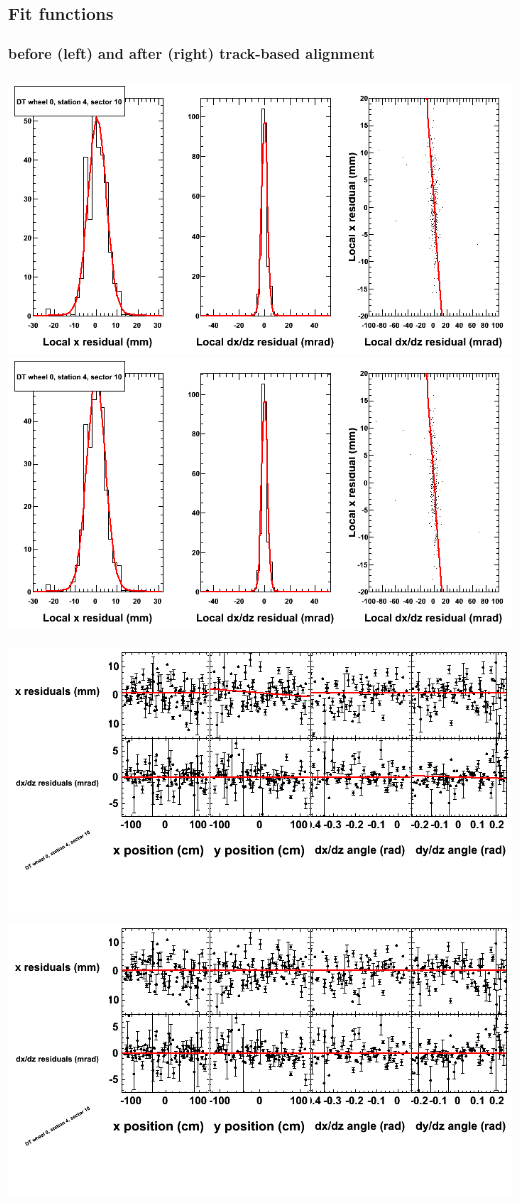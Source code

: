 \documentclass[compress]{beamer}
\begin{document}
\begin{frame}
\frametitle{Fit functions}
\framesubtitle{before (left) and after (right) track-based alignment}
\includegraphics[width=0.5\linewidth]{fitfunctions_re01/MBwhCst4sec10_bellcurves.png} \includegraphics[width=0.5\linewidth]{fitfunctions_re05/MBwhCst4sec10_bellcurves.png}

\includegraphics[width=0.5\linewidth]{fitfunctions_re01/MBwhCst4sec10_polynomials.png} \includegraphics[width=0.5\linewidth]{fitfunctions_re05/MBwhCst4sec10_polynomials.png}
\end{frame}
\end{document}
